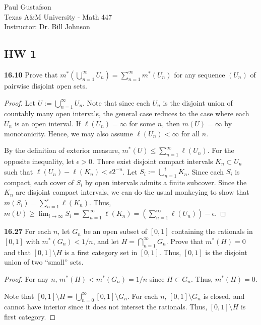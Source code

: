 \documentclass{article}
\newcommand{\p}{\textbf}
\begin{document}
\noindent Paul Gustafson\\
\noindent Texas A\&M University - Math 447\\
\noindent Instructor: Dr. Bill Johnson

\subsection*{HW 1}
\p{16.10} Prove that $m^*(\bigcup_{n=1}^\infty U_n) = \sum_{n=1}^\infty m^*(U_n)$ for any sequence $(U_n)$ of pairwise disjoint open sets.
\begin{proof}
Let $U := \bigcup_{n=1}^\infty U_n$. Note that since each $U_n$ is the disjoint union of countably many open intervals, the general case reduces to the case where each $U_n$ is an open interval. 
If $\ell(U_n) = \infty$ for some $n$, then $m(U) = \infty$ by monotonicity. Hence, we may also assume $\ell(U_n) < \infty$ for all $n$. 

By the definition of exterior measure, $m^*(U) \leq \sum_{n=1}^\infty \ell(U_n)$. For the opposite inequality, let $\epsilon > 0$.  There exist disjoint compact intervals $K_n \subset U_n$ such that $\ell(U_n) - \ell(K_n) < \epsilon 2^{-n}$. Let $S_i := \bigcup_{n=1}^i K_n$.  Since each $S_i$ is compact, each cover of $S_i$ by open intervals admits a finite subcover.  Since the $K_n$ are disjoint compact intervals, we can do the usual monkeying to show that $m(S_i) = \sum_{n=1}^i \ell(K_n)$.  Thus, $m(U) \geq \lim_{i\rightarrow \infty} S_i = \sum_{n=1}^\infty \ell(K_n) = (\sum_{n=1}^\infty \ell(U_n)) - \epsilon$.
\end{proof}



\p{16.27} For each $n$, let $G_n$ be an open subset of $[0,1]$ containing the rationals in $[0,1]$ with $m^*(G_n) < 1/n$, and let $H = \bigcap_{n=1}^\infty G_n$. Prove that $m^*(H) = 0$ and that $[0,1]\setminus H $ is a first category set in $[0,1]$. Thus, $[0,1]$ is the disjoint union of two ``small'' sets.
\begin{proof}
For any $n$, $m^*(H) < m^*(G_n) = 1/n$ since $H \subset G_n$. Thus, $m^*(H) = 0$. 

Note that $[0,1]\setminus H = \bigcup_{n=0}^\infty [0,1]\setminus G_n$. For each $n$, $[0,1]\setminus G_n$ is closed, and cannot have interior since it does not interset the rationals. Thus, $[0,1]\setminus H$ is first category.
\end{proof}
\end{document}
